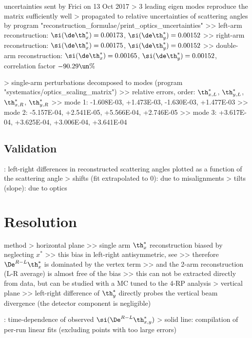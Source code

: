 \> uncertainties sent by Frici on 13 Oct 2017
\>> 3 leading eigen modes reproduce the matrix sufficiently well
\>> propagated to relative uncertainties of scattering angles by program "reconstruction\_formulae/print\_optics\_uncertainties"
\>>> left-arm reconstruction: $\si(\de\th^*_x) = 0.00173$, $\si(\de\th^*_y) = 0.00152$
\>>> right-arm reconstruction: $\si(\de\th^*_x) = 0.00175$, $\si(\de\th^*_y) = 0.00152$
\>>> double-arm reconstruction: $\si(\de\th^*_x) = 0.00165$, $\si(\de\th^*_y) = 0.00152$, correlation factor $-90.29\un{\%}$

\>> single-arm perturbations decomposed to modes (program "systematics/optics\_scaling\_matrix")
\>>> relative errors, order: $\th^*_{x,L}$, $\th^*_{y,L}$, $\th^*_{x,R}$, $\th^*_{y,R}$
\>>> mode 1: -1.608E-03, +1.473E-03, -1.630E-03, +1.477E-03
\>>> mode 2: -5.157E-04, +2.541E-05, +5.566E-04, +2.746E-05
\>>> mode 3: +3.617E-04, +3.625E-04, +3.006E-04, +3.641E-04


\subsection[optics-validation]{Validation}

\> : left-right differences in reconstructed scattering angles plotted as a function of the scattering angle
\>> shifts (fit extrapolated to 0): due to misalignments
\>> tilts (slope): due to optics



\section[resolution]{Resolution}

\> method
\>> horizontal plane
\>>> single arm $\th_x^*$ reconstruction biased by neglecting $x^*$
\>>> this bias in left-right antisymmetric, see 
\>>> therefore $\De^{R-L} \th_x^*$ is dominated by the vertex term
\>>> and the 2-arm reconstruction (L-R average) is almost free of the bias
\>>> this can not be extracted directly from data, but can be studied with a MC tuned to the 4-RP analysis
\>> vertical plane
\>>> left-right difference of $\th_y^*$ directly probes the vertical beam divergence (the detector component is negligible)

\>  : time-dependence of observed $\si(\De^{R-L} \th_{x, y}^*)$
\>> solid line: compilation of per-run linear fits (excluding points with too large errors)

